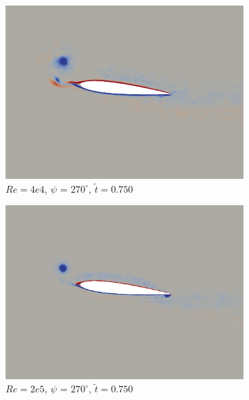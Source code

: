 \begin{figure}[H]\ContinuedFloat
	\centering
	\begin{subfigure}[b]{0.32\textwidth}
		\centering
		\includegraphics[width=1\textwidth]{figures/Vorticity_plots/Re_40k_1pt2/phase_270.png}
		\caption{$Re=4e4$, $\psi$ = $270^\circ$, $\tilde{t}=0.750$}
		\label{fig:Re_40k_1pt2_phi270}
	\end{subfigure}
	\begin{subfigure}[b]{0.32\textwidth}
		\centering
		\includegraphics[width=1\textwidth]{figures/Vorticity_plots/Re_200k_1pt2/phase_270.png}
		\caption{$Re=2e5$, $\psi$ = $270^\circ$, $\tilde{t}=0.750$}
		\label{fig:Re_200k_1pt2_phi270}
	\end{subfigure}
	\begin{subfigure}[b]{0.32\textwidth}

\end{subfigure}
\end{figure}
